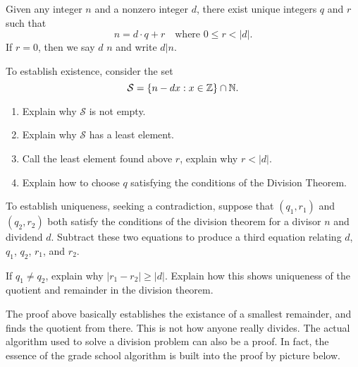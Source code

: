 \documentclass{ximera}
\begin{document}
\begin{theorem}
  Given any integer $n$ and a nonzero integer $d$, there exist unique
  integers $q$ and $r$ such that
  \[
  n = d\cdot q+r\quad\text{where $0\le r< |d|$.}
  \]
  If $r=0$, then we say $d$  $n$ and write $d|n$.
  \begin{sketch}
    To establish existence, consider the set
    \[
    \mathcal{S} = \{n -  dx : x\in \mathbb Z\}\cap \mathbb N.
    \]
    \begin{enumerate}
    \item Explain why $\mathcal S$ is not empty.
    \item Explain why $\mathcal S$ has a least element.
    \item Call the least element found above $r$, explain why $r < |d|$.
    \item Explain how to choose $q$ satisfying the conditions of the
      Division Theorem.
    \end{enumerate}
    
    To establish uniqueness, seeking a contradiction, suppose that
    $(q_1,r_1)$ and $(q_2,r_2)$ both satisfy the conditions of the
    division theorem for a divisor $n$ and dividend $d$. Subtract
    these two equations to produce a third equation relating $d$,
    $q_1$, $q_2$, $r_1$, and $r_2$.


    If $q_1 \ne q_2$, explain why $|r_1 - r_2| \ge |d|$.  Explain how
    this shows uniqueness of the quotient and remainder in the
    division theorem.
  \end{sketch}
\end{theorem}


The proof above basically establishes the existance of a smallest
remainder, and finds the quotient from there. This is not how anyone
really divides.  The actual algorithm used to solve a division problem
can also be a proof. In fact, the essence of the grade school
algorithm is built into the proof by picture below.
\end{document}
